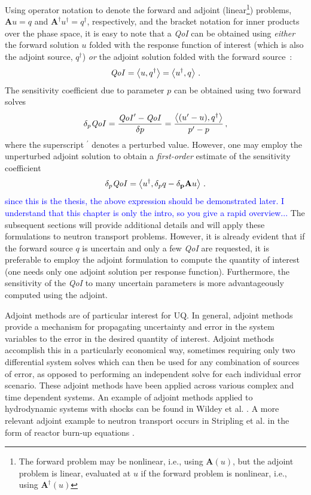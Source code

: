 \documentclass[12pt]{report}
\newcommand{\bra}{\left\langle}
\newcommand{\ket}{\right\rangle}
\newcommand{\qoi}{{\it QoI}\xspace}
\newcommand{\comment}[2]{\marginpar{\textcolor{#2}{$\star$}}\textcolor{#2}{#1}\newline}
\newcommand{\jcr}[1]{\comment{#1}{blue}}
\newcommand{\jcr}[1]{\phantom{a}}
\begin{document}
Using operator notation to denote the forward and adjoint (linear\footnote{The forward problem may be nonlinear, i.e., 
using $\mathbf{A}(u)$, but the adjoint problem is linear, evaluated at $u$ if the forward problem is nonlinear, i.e., 
using $\mathbf{A}^\dag(u)$}) problems, $\mathbf{A}u=q$ and $\mathbf{A}^\dag u^\dag = q^\dag$, respectively, and the 
bracket notation for inner products over the phase space, it is easy to note that a \qoi can be
obtained using {\it either} the forward solution $u$ folded with the response function of interest 
(which is also the adjoint source, $q^\dag$) {\it or} the adjoint solution folded with the forward source~:
\[
\qoi = \bra u, q^\dag \ket = \bra u^\dag, q \ket \,.
\]
The sensitivity coefficient due to parameter $p$ can be obtained using two forward solves
\[
\delta_p \qoi = \frac{\qoi^\prime - \qoi}{\delta p} = \frac{ \bra (u^\prime - u), q^\dag \ket}{p^\prime - p}  \,,
\]
where the superscript $^\prime$ denotes a perturbed value. However, one may employ the unperturbed adjoint solution to obtain
a {\it first-order} estimate of the sensitivity coefficient
\[
\delta_p \qoi = \bra u^\dag, \delta_p q - \mathbf{ \delta_p A} u \ket \,.
\]
\jcr{since this is the thesis, the above expression should be demonstrated later. I understand that this chapter is only the intro, so you give a rapid overview...}
The subsequent sections will provide additional details and will apply these formulations to neutron transport problems. However, it is already evident that if the forward source $q$ is uncertain and only a few \qoi are requested, it is preferable to employ the adjoint formulation to compute the quantity of interest (one needs only one adjoint solution per response function). Furthermore, the sensitivity of the
\qoi to many uncertain parameters is more advantageously computed using the adjoint.


Adjoint methods are of particular interest for UQ. In general, adjoint methods provide a mechanism for propagating uncertainty and error in the system variables to the error in the desired quantity of interest. Adjoint methods accomplish this in a particularly economical way, sometimes requiring only two differential system solves which can then be used for any combination of sources of error, as opposed to performing an independent solve for each individual error scenario. These adjoint methods have been applied across various complex and time dependent systems. An example of adjoint methods applied to hydrodynamic systems with shocks can be found in Wildey et al. \cite{Wildey}. A more relevant adjoint example to neutron transport occurs in Stripling et al. in the form of reactor burn-up equations \cite{Stripling}.
\end{document}
